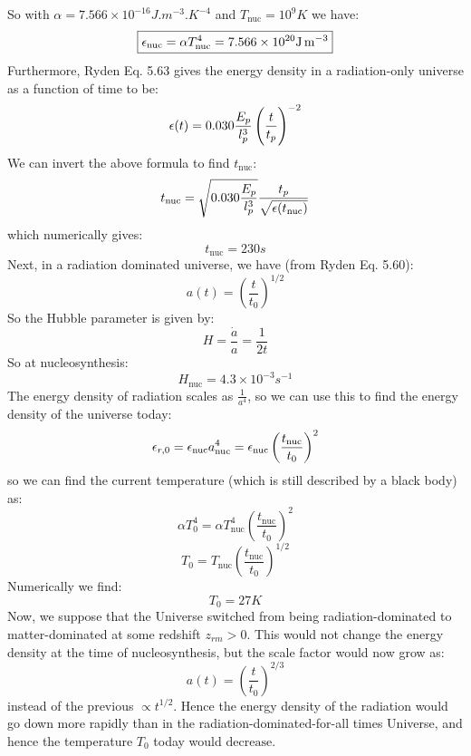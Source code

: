 So with $\alpha = 7.566\times 10^{-16}\si{J.m^{-3}.K^{-4}}$ and $T_{\text{nuc}} = 10^{9}\si{K}$ we have:
\begin{equation}
    \boxed{\e_{\text{nuc}} = \alpha T_{\text{nuc}}^4 = 7.566 \times 10^{20} \si{J.m^{-3}}}
\end{equation}
Furthermore, Ryden Eq. 5.63 gives the energy density in a radiation-only universe as a function of time to be:
\begin{equation}
    \e(t) = 0.030\frac{E_p}{l_p^3}\left(\frac{t}{t_p}\right)^{-2}
\end{equation}
We can invert the above formula to find $t_{\text{nuc}}$:
\begin{equation}
    t_{\text{nuc}} = \sqrt{0.030\frac{E_p}{l_p^3}}\frac{t_p}{\sqrt{\e(t_{\text{nuc}})}}
\end{equation}
which numerically gives:
\begin{equation}
    \boxed{t_{\text{nuc}} = 230\si{s}}
\end{equation}
Next, in a radiation dominated universe, we have (from Ryden Eq. 5.60):
\begin{equation}
    a(t) = \left(\frac{t}{t_0}\right)^{1/2}
\end{equation}
So the Hubble parameter is given by:
\begin{equation}
    H = \frac{\dot{a}}{a} = \frac{1}{2t}
\end{equation}
So at nucleosynthesis:
\begin{equation}
    \boxed{H_{\text{nuc}} = 4.3 \times 10^{-3}\si{s^{-1}}}
\end{equation}
The energy density of radiation scales as $\frac{1}{a^4}$, so we can use this to find the energy density of the universe today:
\begin{equation}
    \e_{r, 0} = \e_{\text{nuc}}a_{\text{nuc}}^4 = \e_{\text{nuc}}\left(\frac{t_{\text{nuc}}}{t_0}\right)^{2}
\end{equation}
so we can find the current temperature (which is still described by a black body) as:
\begin{equation}
    \alpha T_0^4 = \alpha T_{\text{nuc}}^4\left(\frac{t_{\text{nuc}}}{t_0}\right)^{2}
\end{equation}
\begin{equation}
    T_0 =  T_{\text{nuc}}\left(\frac{t_{\text{nuc}}}{t_0}\right)^{1/2}
\end{equation}
Numerically we find:
\begin{equation}
    \boxed{T_0 = 27\si{K}}
\end{equation}
Now, we suppose that the Universe switched from being radiation-dominated to matter-dominated at some redshift $z_{rm} > 0$. This would not change the energy density at the time of nucleosynthesis, but the scale factor would now grow as:
\begin{equation}
    a(t) = \left(\frac{t}{t_0}\right)^{2/3}
\end{equation}
instead of the previous $\propto t^{1/2}$. Hence the energy density of the radiation would go down more rapidly than in the radiation-dominated-for-all times Universe, and hence the temperature $T_0$ today would $\boxed{\text{decrease}}$.